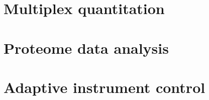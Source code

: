\documentclass[
]{book}
\begin{document}
\hypertarget{multiplex-quantitation}{%
\section{Multiplex quantitation}\label{multiplex-quantitation}}

\hypertarget{proteome-data-analysis}{%
\section{Proteome data analysis}\label{proteome-data-analysis}}

\hypertarget{adaptive-instrument-control}{%
\section{Adaptive instrument control}\label{adaptive-instrument-control}}

  
\end{document}
